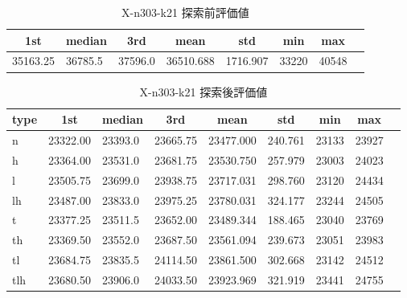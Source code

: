 \begin{table}[htbp]
    \caption{X-n303-k21 探索前評価値}
    \begin{tabular}{|l|l|l|l|l|l|l|l|}\hline
    \multicolumn{1}{|c|}{\textbf{1st}}
    &\multicolumn{1}{c|}{\textbf{median}}
    &\multicolumn{1}{c|}{\textbf{3rd}}
    &\multicolumn{1}{c|}{\textbf{mean}}
    &\multicolumn{1}{c|}{\textbf{std}}
    &\multicolumn{1}{c|}{\textbf{min}}
    &\multicolumn{1}{c|}{\textbf{max}}\\\hline
	35163.25 & 36785.5 & 37596.0 & 36510.688 & 1716.907 & 33220 & 40548\\\hline
	\end{tabular}
\end{table}
\begin{table}[htbp]
    \caption{X-n303-k21 探索後評価値}
    \begin{tabular}{|l|l|l|l|l|l|l|l|l|}\hline
    \multicolumn{1}{|c|}{\textbf{type}}
    &\multicolumn{1}{|c|}{\textbf{1st}}
    &\multicolumn{1}{c|}{\textbf{median}}
    &\multicolumn{1}{c|}{\textbf{3rd}}
    &\multicolumn{1}{c|}{\textbf{mean}}
    &\multicolumn{1}{c|}{\textbf{std}}
    &\multicolumn{1}{c|}{\textbf{min}}
    &\multicolumn{1}{c|}{\textbf{max}}\\\hline
	n & 23322.00 & 23393.0 & 23665.75 & 23477.000 & 240.761 & 23133 & 23927\\\hline
	h & 23364.00 & 23531.0 & 23681.75 & 23530.750 & 257.979 & 23003 & 24023\\\hline
	l & 23505.75 & 23699.0 & 23938.75 & 23717.031 & 298.760 & 23120 & 24434\\\hline
	lh & 23487.00 & 23833.0 & 23975.25 & 23780.031 & 324.177 & 23244 & 24505\\\hline
	t & 23377.25 & 23511.5 & 23652.00 & 23489.344 & 188.465 & 23040 & 23769\\\hline
	th & 23369.50 & 23552.0 & 23687.50 & 23561.094 & 239.673 & 23051 & 23983\\\hline
	tl & 23684.75 & 23835.5 & 24114.50 & 23861.500 & 302.668 & 23142 & 24512\\\hline
	tlh & 23680.50 & 23906.0 & 24033.50 & 23923.969 & 321.919 & 23441 & 24755\\\hline
	\end{tabular}
\end{table}
